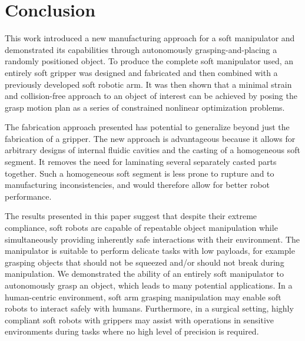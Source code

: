 \section{Conclusion}
\label{sec:conclusion}
This work introduced a new manufacturing approach for a soft manipulator and demonstrated its capabilities through autonomously grasping-and-placing a randomly positioned object.
To produce the complete soft manipulator used, an entirely soft gripper was designed and fabricated and then combined with a previously developed soft robotic arm.
It was then shown that a minimal strain and collision-free approach to an object of interest can be achieved by posing the grasp motion plan as a series of constrained nonlinear optimization problems.

The fabrication approach presented has potential to generalize beyond just the fabrication of a gripper.
The new approach is advantageous because it allows for arbitrary designs of internal fluidic cavities and the casting of a homogeneous soft segment. It removes the need for laminating several separately casted parts together.
Such a homogeneous soft segment is less prone to rupture and to manufacturing inconsistencies, and would therefore allow for better robot performance.

The results presented in this paper suggest that despite their extreme compliance, soft robots are capable of repeatable object manipulation while simultaneously providing inherently safe interactions with their environment.
The manipulator is suitable to perform delicate tasks with low payloads, for example grasping objects that should not be squeezed and/or should not break during manipulation.
We demonstrated the ability of an entirely soft manipulator to autonomously grasp an object, which leads to many potential applications.
In a human-centric environment, soft arm grasping manipulation may enable soft robots to interact safely with humans.
Furthermore, in a surgical setting, highly compliant soft robots with grippers may assist with operations in sensitive environments during tasks where no high level of precision is required.

